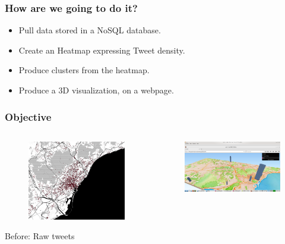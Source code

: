 \documentclass[hyperref={pdfpagelabels=true}]{beamer}
\begin{document}
\begin{frame}
\frametitle{How are we going to do it?}

\begin{itemize}
  \item<2->Pull data stored in a NoSQL database.
  \item<3->Create an Heatmap expressing Tweet density.
  \item<4->Produce clusters from the heatmap.
  \item<5->Produce a 3D visualization, on a webpage.  
\end{itemize}

\end{frame}

\begin{frame}
\frametitle{Objective}
\begin{columns}
  \begin{column}{0.5\textwidth}
      \begin{figure}  
	\includegraphics[width=\textwidth]{tweets_cat.png}\\
       \end{figure}    
    \tiny{Before: Raw tweets}         
  \end{column}
  \begin{column}{0.5\textwidth}
      \begin{figure}  
	\includegraphics[width=\textwidth]{final.png}\\

\end{figure}
\end{column}
\end{columns}
\end{frame}
\end{document}
